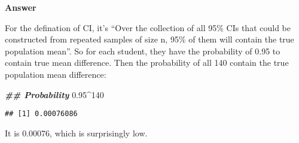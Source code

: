 \documentclass[
]{article}
\newenvironment{Shaded}{\begin{snugshade}}{\end{snugshade}}
\newcommand{\DecValTok}[1]{\textcolor[rgb]{0.00,0.00,0.81}{#1}}
\newcommand{\DocumentationTok}[1]{\textcolor[rgb]{0.56,0.35,0.01}{\textbf{\textit{#1}}}}
\newcommand{\FloatTok}[1]{\textcolor[rgb]{0.00,0.00,0.81}{#1}}
\newcommand{\SpecialCharTok}[1]{\textcolor[rgb]{0.00,0.00,0.00}{#1}}
\begin{document}
\textbf{Answer}

For the defination of CI, it's ``Over the collection of all 95\% CIs
that could be constructed from repeated samples of size n, 95\% of them
will contain the true population mean''. So for each student, they have
the probability of 0.95 to contain true mean difference. Then the
probability of all 140 contain the true population mean difference:

\begin{Shaded}
\begin{Highlighting}[]
\DocumentationTok{\#\# Probability}
\FloatTok{0.95}\SpecialCharTok{\^{}}\DecValTok{140}
\end{Highlighting}
\end{Shaded}

\begin{verbatim}
## [1] 0.00076086
\end{verbatim}

It is 0.00076, which is surprisingly low.
\end{document}
